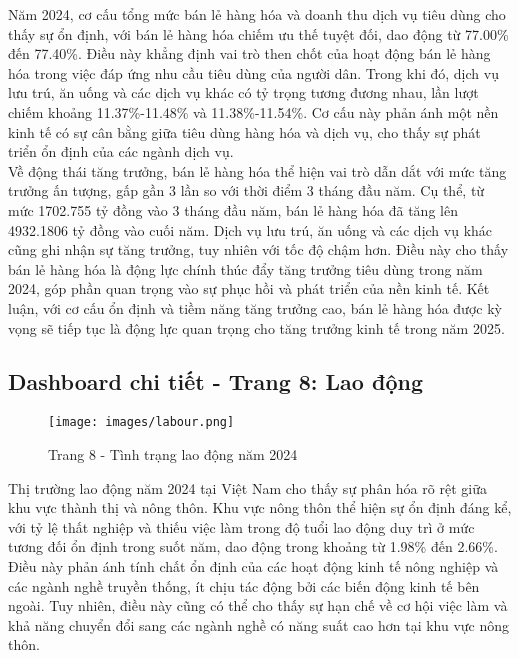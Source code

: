 \documentclass[a4paper]{report}
\begin{document}
{{Năm 2024, cơ cấu tổng mức bán lẻ hàng hóa và doanh thu dịch vụ tiêu dùng cho thấy sự ổn định, với bán lẻ hàng hóa chiếm ưu thế tuyệt đối, dao động từ 77.00\% đến 77.40\%. Điều này khẳng định vai trò then chốt của hoạt động bán lẻ hàng hóa trong việc đáp ứng nhu cầu tiêu dùng của người dân. Trong khi đó, dịch vụ lưu trú, ăn uống và các dịch vụ khác có tỷ trọng tương đương nhau, lần lượt chiếm khoảng 11.37\%-11.48\% và 11.38\%-11.54\%. Cơ cấu này phản ánh một nền kinh tế có sự cân bằng giữa tiêu dùng hàng hóa và dịch vụ, cho thấy sự phát triển ổn định của các ngành dịch vụ.\\

Về động thái tăng trưởng, bán lẻ hàng hóa thể hiện vai trò dẫn dắt với mức tăng trưởng ấn tượng, gấp gần 3 lần so với thời điểm 3 tháng đầu năm. Cụ thể, từ mức 1702.755 tỷ đồng vào 3 tháng đầu năm, bán lẻ hàng hóa đã tăng lên 4932.1806 tỷ đồng vào cuối năm. Dịch vụ lưu trú, ăn uống và các dịch vụ khác cũng ghi nhận sự tăng trưởng, tuy nhiên với tốc độ chậm hơn. Điều này cho thấy bán lẻ hàng hóa là động lực chính thúc đẩy tăng trưởng tiêu dùng trong năm 2024, góp phần quan trọng vào sự phục hồi và phát triển của nền kinh tế. Kết luận, với cơ cấu ổn định và tiềm năng tăng trưởng cao, bán lẻ hàng hóa được kỳ vọng sẽ tiếp tục là động lực quan trọng cho tăng trưởng kinh tế trong năm 2025.

\newpage
\subsection{Dashboard chi tiết - Trang 8: Lao động}

\begin{figure}[H]
    \centering
    \texttt{[image: images/labour.png]}
    \caption{Trang 8 - Tình trạng lao động năm 2024}
    \label{fig:enter-label}
\end{figure}

Thị trường lao động năm 2024 tại Việt Nam cho thấy sự phân hóa rõ rệt giữa khu vực thành thị và nông thôn. Khu vực nông thôn thể hiện sự ổn định đáng kể, với tỷ lệ thất nghiệp và thiếu việc làm trong độ tuổi lao động duy trì ở mức tương đối ổn định trong suốt năm, dao động trong khoảng từ 1.98\% đến 2.66\%. Điều này phản ánh tính chất ổn định của các hoạt động kinh tế nông nghiệp và các ngành nghề truyền thống, ít chịu tác động bởi các biến động kinh tế bên ngoài. Tuy nhiên, điều này cũng có thể cho thấy sự hạn chế về cơ hội việc làm và khả năng chuyển đổi sang các ngành nghề có năng suất cao hơn tại khu vực nông thôn.\\

}}
\end{document}
